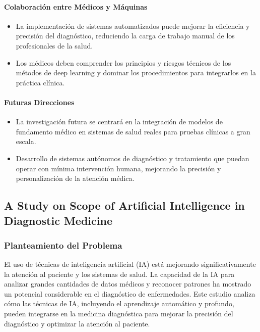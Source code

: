 \paragraph{Colaboración entre Médicos y Máquinas}

\begin{itemize}
    \item La implementación de sistemas automatizados puede mejorar la eficiencia y precisión del diagnóstico, reduciendo la carga de trabajo manual de los profesionales de la salud.
    \item Los médicos deben comprender los principios y riesgos técnicos de los métodos de deep learning y dominar los procedimientos para integrarlos en la práctica clínica.
\end{itemize}

\paragraph{Futuras Direcciones}

\begin{itemize}
    \item La investigación futura se centrará en la integración de modelos de fundamento médico en sistemas de salud reales para pruebas clínicas a gran escala.
    \item Desarrollo de sistemas autónomos de diagnóstico y tratamiento que puedan operar con mínima intervención humana, mejorando la precisión y personalización de la atención médica.
\end{itemize}

\subsection{A Study on Scope of Artificial Intelligence in Diagnostic Medicine \citep{santhoshkumar2023}} 

\subsubsection{Planteamiento del Problema}

El uso de técnicas de inteligencia artificial (IA) está mejorando significativamente la atención al paciente y los sistemas de salud. La capacidad de la IA para analizar grandes cantidades de datos médicos y reconocer patrones ha mostrado un potencial considerable en el diagnóstico de enfermedades. Este estudio analiza cómo las técnicas de IA, incluyendo el aprendizaje automático y profundo, pueden integrarse en la medicina diagnóstica para mejorar la precisión del diagnóstico y optimizar la atención al paciente.

